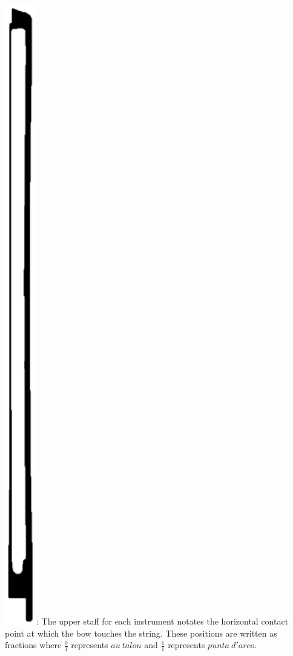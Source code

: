 \documentclass[10pt]{article}
\begin{document}
 \includegraphics[height=0.025\textheight]{bow_position_tablature.eps}: The upper staff for each instrument notates the horizontal contact point at which the bow touches the string. These positions are written as fractions where \( \frac{0}{1} \) represents $au \ talon$ and \( \frac{1}{1} \) represents $punta \ d'arco$.
\end{document}
